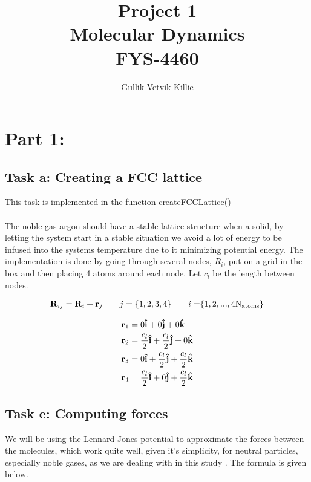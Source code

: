 \documentclass[11pt]{article}
\title{ Project 1 \\ Molecular Dynamics \\ FYS-4460 }
\author{Gullik Vetvik Killie }
\begin{document}
\maketitle

\tableofcontents

\section{Part 1:}
\subsection{Task a: Creating a FCC lattice}
	This task is implemented in the function createFCCLattice()
\\ \\
	\noindent The noble gas argon should have a stable lattice structure when a solid, by letting the system start in a stable situation we avoid a lot of energy to be infused into the systems temperature due to it minimizing potential energy. The implementation is done by going through several nodes, \(R_i\), put on a grid in the box and then placing 4 atoms around each node. Let \(c_l\) be the length between nodes.

	\begin{align*}
	\vb{R}_{ij} = \vb{R}_i + \vb{r}_j \qquad{j }= \{1,2,3,4\} \qquad{i = }\{1,2, ... , 4\text{N}_{\text{atoms}}\}
	\end{align*}

	\begin{align*}
		\vb{r}_1 &= 0 \vu{i} + 0 \vu{j} + 0 \vu{k}
		\\
		\vb{r}_2 &= \frac{c_l}{2} \vu{i} + \frac{c_l}{2} \vu{j} + 0 \vu{k}
		\\
		\vb{r}_3 &= 0 \vu{i} + \frac{c_l}{2} \vu{j} + \frac{c_l}{2} \vu{k}
		\\
		\vb{r}_4 &= \frac{c_l}{2} \vu{i} + 0 \vu{j} + \frac{c_l}{2} \vu{k}
	\end{align*}

\subsection{Task e: Computing forces}

\label{sub:potential}

		We will be using the Lennard-Jones potential to approximate the forces between the molecules, which work quite well, given it's simplicity, for neutral particles, especially noble gases, as we are dealing with in this study \cite{Wiki}. The formula is given below.
\end{document}
